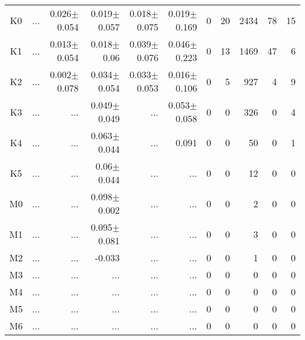 \begin{table}[t]
\begin{center}
\begin{tabular}{c|rrrrr|rrrrr}
K0	&	 ...	&	0.026$\pm$0.054	&	0.019$\pm$0.057	&	0.018$\pm$0.075	&	0.019$\pm$0.169	&	0	&	20	&	2434	&	78	&	15	\\
K1	&	 ...	&	0.013$\pm$0.054	&	0.018$\pm$0.06	&	0.039$\pm$0.076	&	0.046$\pm$0.223	&	0	&	13	&	1469	&	47	&	6	\\
K2	&	 ...	&	0.002$\pm$0.078	&	0.034$\pm$0.054	&	0.033$\pm$0.053	&	0.016$\pm$0.106	&	0	&	5	&	927	&	4	&	9	\\
K3	&	 ...	&	 ...	&	0.049$\pm$0.049	&	 ...	&	0.053$\pm$0.058	&	0	&	0	&	326	&	0	&	4	\\
K4	&	 ...	&	 ...	&	0.063$\pm$0.044	&	 ...	&	0.091	&	0	&	0	&	50	&	0	&	1	\\
K5	&	 ...	&	 ...	&	0.06$\pm$0.044	&	 ...	&	 ...	&	0	&	0	&	12	&	0	&	0	\\
M0	&	 ...	&	 ...	&	0.098$\pm$0.002	&	 ...	&	 ...	&	0	&	0	&	2	&	0	&	0	\\
M1	&	 ...	&	 ...	&	0.095$\pm$0.081	&	 ...	&	 ...	&	0	&	0	&	3	&	0	&	0	\\
M2	&	 ...	&	 ...	&	-0.033	&	 ...	&	 ...	&	0	&	0	&	1	&	0	&	0	\\
M3	&	 ...	&	 ...	&	 ...	&	 ...	&	 ...	&	0	&	0	&	0	&	0	&	0	\\
M4	&	 ...	&	 ...	&	 ...	&	 ...	&	 ...	&	0	&	0	&	0	&	0	&	0	\\
M5	&	 ...	&	 ...	&	 ...	&	 ...	&	 ...	&	0	&	0	&	0	&	0	&	0	\\
M6	&	 ...	&	 ...	&	 ...	&	 ...	&	 ...	&	0	&	0	&	0	&	0	&	0	\\
    \bottomrule
    \end{tabular}
\end{center}
\end{table}


